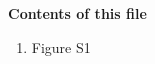 \documentclass[draft,grl]{agutexSI2019}
\begin{document}
\begin{article}



\noindent\textbf{Contents of this file}
\begin{enumerate}
\item Figure S1
\end{enumerate}





%
%



% 
%
%
%
%

%  




%
%
%
%
%

%
%
\end{article}
\end{document}
